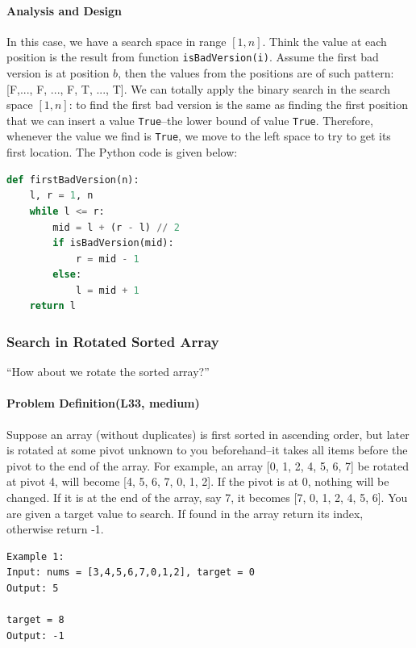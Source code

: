 \documentclass[main.tex]{subfiles}
\begin{document}
\paragraph{Analysis and Design} In this case, we have a search space in range $[1, n]$. Think the value at each position is the result from function \texttt{isBadVersion(i)}. Assume the first bad version is at position $b$, then the values from the positions are of such pattern: [F,..., F, ..., F, T, ..., T]. We can totally apply the binary search in the search space $[1, n]$: to find the first bad version is the same as finding the first position that we can insert a value \texttt{True}--the lower bound of value \texttt{True}. Therefore, whenever the value we find is \texttt{True}, we move to the left space to try to get its first location. The Python code is given below:
\begin{lstlisting}[language = Python]
def firstBadVersion(n):
    l, r = 1, n
    while l <= r:
        mid = l + (r - l) // 2
        if isBadVersion(mid):
            r = mid - 1
        else:
            l = mid + 1           
    return l
\end{lstlisting}
\subsubsection{Search in Rotated Sorted Array}
``How about we rotate the sorted array?''
\paragraph{Problem Definition(L33, medium)} Suppose an array (without duplicates) is first sorted in ascending order, but later is rotated at some pivot unknown to you beforehand--it takes all items before the pivot to the end of the array. For example, an array [0, 1, 2, 4, 5, 6, 7] be rotated at pivot 4, will become [4, 5, 6, 7, 0, 1, 2]. If the pivot is at 0, nothing will be changed. If it is at the end of the array, say 7, it becomes [7, 0, 1, 2, 4, 5, 6]. You are given a target value to search. If found in the array return its index, otherwise return -1. 
\begin{lstlisting}[numbers=none]
Example 1:
Input: nums = [3,4,5,6,7,0,1,2], target = 0
Output: 5

target = 8
Output: -1
\end{lstlisting}
\end{document}
